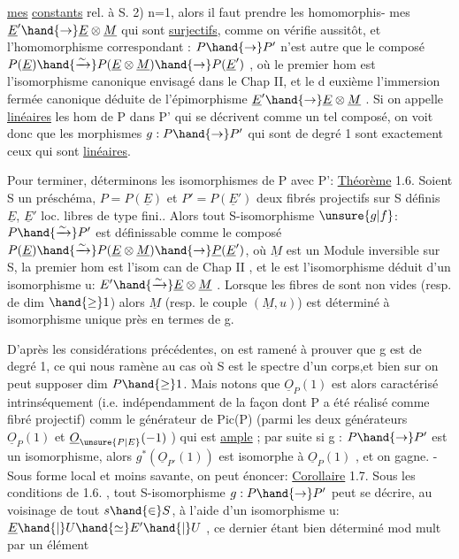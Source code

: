 
\uline{mes} \uline{constants} rel. à S. 2) n=1, alors il faut prendre les homomorphis-%
mes  $\underline{E}'\hand{\to} \underline{E}\otimes\underline{M}$ qui sont \uline{surjectifs}, comme on vérifie
aussitôt, et l'homomorphisme correspondant : $P\hand{\to} P'$ n'est autre que le
composé $P(\underline{E})\hand{\xrightarrow{\sim}}P(\underline{E}\otimes\underline{M})\hand{\to} P(\underline{E}')$ , où le premier hom est l'isomorphisme
canonique envisagé dans le Chap II, et le d euxième l'immersion fermée
canonique déduite de l'épimorphisme $\underline{E}'\hand{\to}\underline{E}\otimes\underline{M}$ . Si on appelle \uline{linéaires}
les hom de P dans P' qui se décrivent comme un tel composé, on voit donc
que les morphismes $g:P\hand{\to} P'$ qui sont de degré 1 sont exactement ceux qui
sont \uline{linéaires}.

Pour terminer, déterminons les isomorphismes de P avec P':
\uline{Théorème} 1.6. Soient S un préschéma, $P=P(\underline{E})$ et $P'=P(\underline{E}')$ deux fibrés
projectifs sur S définis  $\underline{E}$, $\underline{E}'$ loc. libres de type fini.. Alors tout S-isomorphisme $\unsure{g|f}$: $P\hand{\xrightarrow{\sim}}P'$ est définissable
comme le composé $P(\underline{E})\hand{\xrightarrow{\sim}}P(\underline{E}\otimes\underline{M})\hand{\to} \underline{P}(\underline{E}')$, où $\underline{M}$ est un Module inversible sur S, la premier hom est l'isom
can de Chap II , et le  est l'isomorphisme  déduit
d'un isomorphisme u: $E'\hand{\xrightarrow{\sim}}\underline{E}\otimes\underline{M}$ . Lorsque les fibres de  sont non
vides (resp. de dim $\hand{\geq} 1$) alors $\underline{M}$ (resp. le couple $(\underline{M},u)$) est déterminé
à isomorphisme unique près en termes de g.

D'après les considérations précédentes, on est ramené à prouver
que g est de degré 1, ce qui nous ramène au cas où S est le spectre d'un
corps,et bien sur on peut supposer dim $P\hand{\geq} 1$. Mais notons que $\underline{O}_P(1)$ est alors caractérisé intrinséquement (i.e.
indépendamment de la façon dont P a été réalisé comme fibré projectif)
comm le générateur de Pic(P) (parmi les deux générateurs $\underline{O}_P(1)$ et
$\underline{O}_{\unsure{P|E}}(-1)$ ) qui est \uline{ample} ; par suite si g : $P\hand{\to} P'$ est un isomorphisme,
alors $g^{*}(\underline{O}_{P'}(1))$ est isomorphe à $\underline{O}_P(1)$ , et on gagne. - Sous forme local
et moins savante, on peut énoncer:
\uline{Corollaire} 1.7. Sous les conditions de 1.6. , tout S-isomorphisme $g:P\hand{\to} P'$
peut se décrire, au voisinage de tout $s\hand{\in} S$, à l'aide d'un isomorphisme
u: $\underline{E}\hand{|}U \hand{\simeq} E'\hand{|}U$ , ce dernier étant bien déterminé mod mult par un élément
